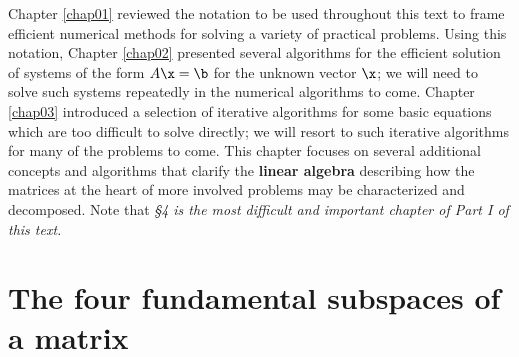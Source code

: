  

Chapter \ref{chap01} reviewed the notation to be used throughout this text to frame efficient numerical methods for solving a variety of practical problems.
Using this notation, Chapter \ref{chap02} presented several algorithms for the efficient solution of systems of
the form $A\x = \b$ for the unknown vector $\x$; we will need to solve such systems repeatedly in the numerical algorithms to come.
Chapter \ref{chap03} introduced a selection of iterative algorithms for some basic equations which are too difficult to solve directly; we will resort to such iterative algorithms for many of the problems to come.
This chapter focuses on several additional concepts and algorithms that clarify the {\bf linear algebra} describing how the
matrices at the heart of more involved problems may be characterized and decomposed.
Note that {\it \S 4 is the most difficult and important chapter of Part I of this text.} 

\section{The four fundamental subspaces of a matrix}\label{sec.A.A.I}


